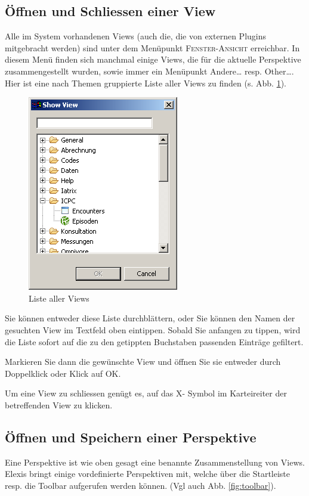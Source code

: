 \subsection{Öffnen und Schliessen einer View}
Alle im System vorhandenen Views (auch die, die von externen Plugins mitgebracht
werden) sind unter dem Menüpunkt \textsc{Fenster-Ansicht} erreichbar. In diesem
Menü finden sich manchmal einige Views, die für die aktuelle Perspektive
zusammengestellt wurden, sowie immer ein Menüpunkt \glqq Andere\ldots\grqq{}
resp. \glqq Other\ldots\grqq{}. Hier ist eine nach Themen gruppierte Liste aller
Views zu finden (s. Abb. \ref{fig:viewlist}).
\begin{figure}[htp]
\begin{center}
  \includegraphics{images/showviewdialog}
  \caption{Liste aller Views}
  \label{fig:viewlist}
\end{center}
\end{figure}

Sie können entweder diese Liste durchblättern, oder Sie können den Namen der
gesuchten View im Textfeld oben eintippen. Sobald Sie anfangen zu tippen, wird
die Liste sofort auf die zu den getippten Buchstaben passenden Einträge
gefiltert.

Markieren Sie dann die gewünschte View und öffnen Sie sie entweder durch
Doppelklick oder Klick auf \glqq OK\grqq{}.

\par
Um eine View zu schliessen genügt es, auf das  X- Symbol im Karteireiter der
betreffenden View zu klicken.

\subsection{Öffnen und Speichern einer Perspektive}
\label{perspektiven} 
Eine Perspektive ist wie oben gesagt eine benannte Zusammenstellung von Views.
Elexis bringt einige vordefinierte Perspektiven mit, welche über die Startleiste
resp. die Toolbar aufgerufen werden können. (Vgl auch Abb. \ref{fig:toolbar}).

